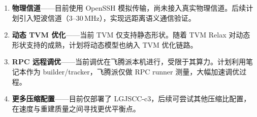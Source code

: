 \documentclass[lang=cn,a4paper,newtx,citestyle=gb7714-2015,bibstyle=gb7714-2015]{elegantpaper}
\begin{document}
\begin{enumerate}
  \item \textbf{物理信道}——目前使用 OpenSSH 模拟传输，尚未接入真实物理信道。后续计划引入短波信道（3--30\,MHz），实现远距离语义通信验证。
  \item \textbf{动态 TVM 优化}——当前 TVM 仅支持静态形状。随着 TVM Relax 对动态形状支持的成熟，计划将动态模型也纳入 TVM 优化链路。
  \item \textbf{RPC 远程调优}——当前调优在飞腾派本机进行，受限于其算力。计划利用笔记本作为 builder/tracker，飞腾派仅做 RPC runner 测量，大幅加速调优过程。
  \item \textbf{更多压缩配置}——目前仅部署了 LGJSCC-c3，后续可尝试其他压缩比配置，在速度与重建质量之间寻找更优平衡点。
\end{enumerate}

\printbibliography[heading=bibintoc, title=参考文献]
\end{document}
